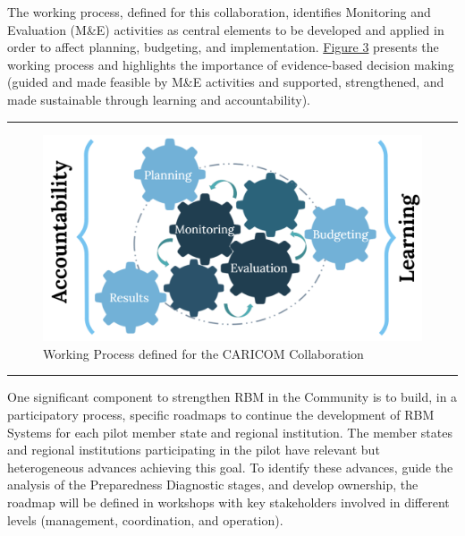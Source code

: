 \documentclass[
  10pt,
]{book}
\begin{document}
The working process, defined for this collaboration, identifies Monitoring and Evaluation (M\&E) activities as central elements to be developed and applied in order to affect planning, budgeting, and implementation. \protect\hyperlink{fig:figure3}{Figure 3} presents the working process and highlights the importance of evidence-based decision making (guided and made feasible by M\&E activities and supported, strengthened, and made sustainable through learning and accountability).

\begin{center}\rule{0.5\linewidth}{0.5pt}\end{center}

\begin{figure}

{\centering \includegraphics[width=1\linewidth]{./images/figure_3} 

}

\caption{Working Process defined for the CARICOM Collaboration}\label{fig:figure3}
\end{figure}

\begin{center}\rule{0.5\linewidth}{0.5pt}\end{center}

One significant component to strengthen RBM in the Community is to build, in a participatory process, specific roadmaps to continue the development of RBM Systems for each pilot member state and regional institution. The member states and regional institutions participating in the pilot have relevant but heterogeneous advances achieving this goal. To identify these advances, guide the analysis of the Preparedness Diagnostic stages, and develop ownership, the roadmap will be defined in workshops with key stakeholders involved in different levels (management, coordination, and operation).
\end{document}
